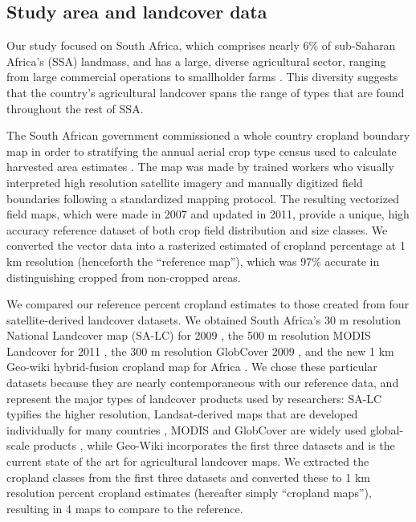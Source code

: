 \documentclass{pnastwo}
\begin{document}
\begin{article}
\vspace{-0.5 cm}
\section{Study area and landcover data}
Our study focused on South Africa, which comprises nearly 6\% of sub-Saharan Africa's (SSA) landmass, and has a large, diverse agricultural sector, ranging from large commercial operations to smallholder farms \cite{hardy_rainfed_2011,estes_using_2014}. This diversity suggests that the country's agricultural landcover spans the range of types that are found throughout the rest of SSA.  

The South African government commissioned a whole country cropland boundary map in order to stratifying the annual aerial crop type census used to calculate harvested area estimates \cite{fourie_better_2009}. The map was made by trained workers who visually interpreted high resolution satellite imagery and manually digitized field boundaries following a standardized mapping protocol. The resulting vectorized field maps, which were made in 2007 and updated in 2011, provide a unique, high accuracy reference dataset of both crop field distribution and size classes.  We converted the vector data into a rasterized estimated of cropland percentage at 1 km resolution (henceforth the ``reference map''), which was 97\% accurate in distinguishing cropped from non-cropped areas. 

We compared our reference percent cropland estimates to those created from four satellite-derived landcover datasets. We obtained South Africa's 30 m resolution National Landcover map (SA-LC) for 2009 \cite{sanbi_national_2009}, the 500 m resolution MODIS Landcover for 2011 \cite{land_processes_distributed_active_archive_center_lp_daac_modis_2011, friedl_modis_2010}, the 300 m resolution GlobCover 2009 \cite{arino_global_2012}, and the new 1 km Geo-wiki hybrid-fusion cropland map for Africa \cite{fritz_mapping_2015}. We chose these particular datasets because they are nearly contemporaneous with our reference data, and represent the major types of landcover products used by researchers: SA-LC typifies the higher resolution, Landsat-derived maps that are developed individually for many countries \cite{fry_completion_2009},  MODIS and GlobCover are widely used global-scale products \cite{gross_monitoring_2013,shackelford_conservation_2015}, while Geo-Wiki incorporates the first three datasets and is the current state of the art for agricultural landcover maps. We extracted the cropland classes from the first three datasets and converted these to 1 km resolution percent cropland estimates (hereafter simply ``cropland maps''), resulting in 4 maps to compare to the reference.  


\end{article}
\end{document}
